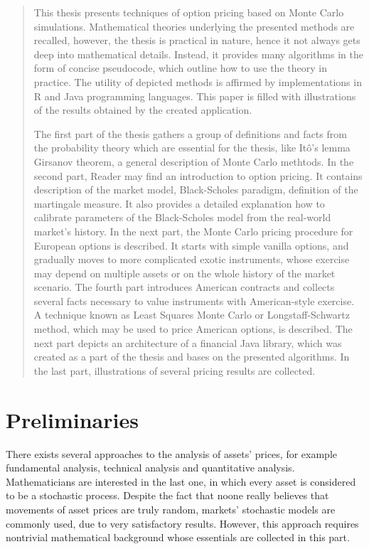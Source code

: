 \documentclass[a4paper,11pt, twoside]{book}
\theoremstyle{definition}
\theoremstyle{remark}
\begin{document}
\begin{quotation}
\noindent
  This thesis presents techniques of option pricing based on Monte Carlo simulations. Mathematical theories underlying the presented methods are recalled, however, the thesis is practical in nature, hence it not always gets deep into mathematical details.
  Instead, it provides many algorithms in the form of concise pseudocode, which outline how to use the theory in practice. The utility of depicted methods is affirmed by implementations in R and Java programming languages. This paper is filled with illustrations of the results obtained by the created application.
  
  The first part of the thesis gathers a group of definitions and facts from the probability theory which are essential for the thesis, like It\^{o}'s lemma Girsanov theorem, a general description of Monte Carlo methtods.
  In the second part, Reader may find an introduction to option pricing. It contains description of the market model, Black-Scholes paradigm, definition of the martingale measure. It also provides a detailed explanation how to calibrate parameters of the Black-Scholes model from the real-world market's history.
  In the next part, the Monte Carlo pricing procedure for European options is described. It starts with simple vanilla options, and gradually moves to more complicated exotic instruments, whose exercise may depend on multiple assets or on the whole history of the market scenario. 
  The fourth part introduces American contracts and collects several facts necessary to value instruments with American-style exercise. A technique known as Least Squares Monte Carlo or Longstaff-Schwartz method, which may be used to price American options, is described.
  The next part depicts an architecture of a financial Java library, which was created as a part of the thesis and bases on the presented algorithms.
  In the last part, illustrations of several pricing results are collected.
\end{quotation}

\chapter{Preliminaries}
There exists several approaches to the analysis of assets' prices, for example fundamental analysis, technical analysis and quantitative analysis. Mathematicians are interested in the last one, in which every asset is considered to be a stochastic process.
Despite the fact that noone really believes that movements of asset prices are truly random, markets' stochastic models are commonly used, due to very satisfactory results. However, this approach requires nontrivial mathematical background whose essentials are collected in this part.
\end{document}
